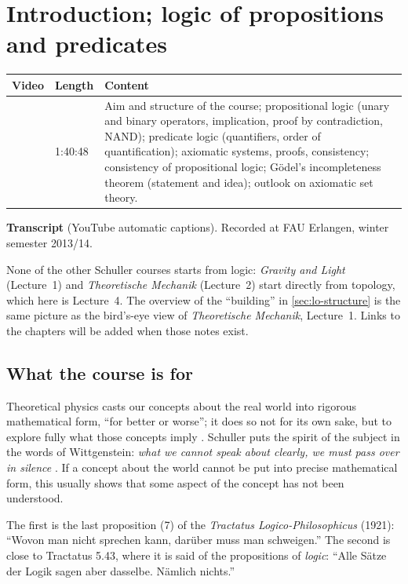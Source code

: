 \chapter{Introduction; logic of propositions and predicates}\label{ch:logic}
\begin{paracol}{2}

\begin{sources}
\begin{tabularx}{\linewidth}{@{}l l L@{}}
\toprule
\textbf{Video} & \textbf{Length} & \textbf{Content}\\
\midrule
{} & 1:40:48 & Aim and structure of the
course; propositional logic (unary and binary operators, implication, proof by contradiction, NAND);
predicate logic (quantifiers, order of quantification); axiomatic systems, proofs, consistency;
consistency of propositional logic; G\"odel's incompleteness theorem (statement and idea); outlook on
axiomatic set theory.\\
\bottomrule
\end{tabularx}

\smallskip
\textbf{Transcript}  (YouTube automatic captions).
Recorded at FAU Erlangen, winter semester 2013/14.
\end{sources}

\begin{reading}
None of the other Schuller courses starts from logic: \emph{Gravity and Light} (Lecture~1) and
\emph{Theoretische Mechanik} (Lecture~2) start directly from topology, which here is Lecture~4.
The overview of the ``building'' in \cref{sec:lo-structure} is the same picture as the bird's-eye view of
\emph{Theoretische Mechanik}, Lecture~1. Links to the chapters will be added when those notes exist.
\end{reading}

\section{What the course is for}\label{sec:lo-aims}

Theoretical physics casts our concepts about the real world into rigorous mathematical form, ``for better or
worse''; it does so not for its own sake, but to explore fully what those concepts imply .
Schuller puts the spirit of the subject in the words of Wittgenstein: \emph{what we cannot speak about clearly,
we must pass over in silence} . If a concept about the world cannot be put into precise
mathematical form, this usually shows that some aspect of the concept has not been understood.
\begin{coursenote}
The first is the last proposition (7) of the \emph{Tractatus Logico-Philosophicus} (1921): ``Wovon man nicht
sprechen kann, dar\"uber muss man schweigen.'' The second is close to Tractatus 5.43, where it is said of the
propositions of \emph{logic}: ``Alle S\"atze der Logik sagen aber dasselbe. N\"amlich nichts.''
\end{coursenote}


\end{paracol}
